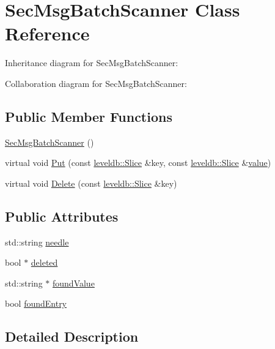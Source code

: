\hypertarget{class_sec_msg_batch_scanner}{}\section{Sec\+Msg\+Batch\+Scanner Class Reference}
\label{class_sec_msg_batch_scanner}


Inheritance diagram for Sec\+Msg\+Batch\+Scanner\+:


Collaboration diagram for Sec\+Msg\+Batch\+Scanner\+:
\subsection*{Public Member Functions}
\begin{DoxyCompactItemize}
\item 
\hyperlink{class_sec_msg_batch_scanner_a34442f9306b1d848def23e4a08a29c0b}{Sec\+Msg\+Batch\+Scanner} ()
\item 
virtual void \hyperlink{class_sec_msg_batch_scanner_ad43a3dd99b44578696b0582c4e08f158}{Put} (const \hyperlink{classleveldb_1_1_slice}{leveldb\+::\+Slice} \&key, const \hyperlink{classleveldb_1_1_slice}{leveldb\+::\+Slice} \&\hyperlink{cache_8cc_a0f61d63b009d0880a89c843bd50d8d76}{value})
\item 
virtual void \hyperlink{class_sec_msg_batch_scanner_a353fc7e6d79d762092646f00c7dc0f60}{Delete} (const \hyperlink{classleveldb_1_1_slice}{leveldb\+::\+Slice} \&key)
\end{DoxyCompactItemize}
\subsection*{Public Attributes}
\begin{DoxyCompactItemize}
\item 
std\+::string \hyperlink{class_sec_msg_batch_scanner_a15f820824b8c5f64a3fba97b9133a50e}{needle}
\item 
bool $\ast$ \hyperlink{class_sec_msg_batch_scanner_a184ca3c1ae1f48ab994852af4b6b741e}{deleted}
\item 
std\+::string $\ast$ \hyperlink{class_sec_msg_batch_scanner_a1f9a62489af577112cbe0db50e155e58}{found\+Value}
\item 
bool \hyperlink{class_sec_msg_batch_scanner_a1842d0e149b314a7beb82cc4840f5565}{found\+Entry}
\end{DoxyCompactItemize}


\subsection{Detailed Description}


